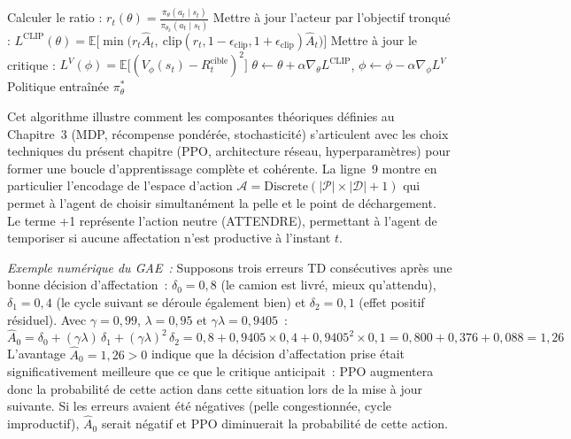 \documentclass[11pt,a4paper]{report}
\begin{document}
\begin{algorithm}[H]
\begin{algorithmic}[1]
        \STATE Calculer le ratio : $r_t(\theta) = \frac{\pi_\theta(a_t \mid s_t)}{\pi_{\theta_k}(a_t \mid s_t)}$
        \STATE Mettre à jour l'acteur par l'objectif tronqué :
        \STATE \hspace{1em} $L^{\text{CLIP}}(\theta) = \mathbb{E}\big[\min\big(r_t \hat{A}_t,\ \text{clip}(r_t, 1 - \epsilon_{\text{clip}}, 1 + \epsilon_{\text{clip}}) \hat{A}_t\big)\big]$
        \STATE Mettre à jour le critique :
        \STATE \hspace{1em} $L^{V}(\phi) = \mathbb{E}\big[(V_\phi(s_t) - R_t^{\text{cible}})^2\big]$
        \STATE $\theta \leftarrow \theta + \alpha \nabla_\theta L^{\text{CLIP}}$, \quad $\phi \leftarrow \phi - \alpha \nabla_\phi L^{V}$
    \ENDFOR
\ENDFOR
\RETURN Politique entraînée $\pi_\theta^*$

\end{algorithmic}
\end{algorithm}

Cet algorithme illustre comment les composantes théoriques définies au Chapitre~3 (MDP, récompense pondérée, stochasticité) s'articulent avec les choix techniques du présent chapitre (PPO, architecture réseau, hyperparamètres) pour former une boucle d'apprentissage complète et cohérente. La ligne~9 montre en particulier l'encodage de l'espace d'action $\mathcal{A} = \text{Discrete}(|\mathcal{P}| \times |\mathcal{D}| + 1)$ qui permet à l'agent de choisir simultanément la pelle et le point de déchargement. Le terme +1 représente l'action neutre (ATTENDRE), permettant à l'agent de temporiser si aucune affectation n'est productive à l'instant $t$.

\textit{Exemple numérique du GAE~:} Supposons trois erreurs TD consécutives après une bonne décision d'affectation~: $\delta_0 = 0{,}8$ (le camion est livré, mieux qu'attendu), $\delta_1 = 0{,}4$ (le cycle suivant se déroule également bien) et $\delta_2 = 0{,}1$ (effet positif résiduel). Avec $\gamma = 0{,}99$, $\lambda = 0{,}95$ et $\gamma\lambda = 0{,}9405$~:
\begin{equation}
    \hat{A}_0 = \delta_0 + (\gamma\lambda)\,\delta_1 + (\gamma\lambda)^2\,\delta_2
             = 0{,}8 + 0{,}9405 \times 0{,}4 + 0{,}9405^2 \times 0{,}1
             = 0{,}800 + 0{,}376 + 0{,}088
             = 1{,}26
\end{equation}
L'avantage $\hat{A}_0 = 1{,}26 > 0$ indique que la décision d'affectation prise était significativement meilleure que ce que le critique anticipait~: PPO augmentera donc la probabilité de cette action dans cette situation lors de la mise à jour suivante. Si les erreurs avaient été négatives (pelle congestionnée, cycle improductif), $\hat{A}_0$ serait négatif et PPO diminuerait la probabilité de cette action.
\end{document}
